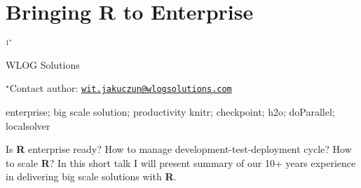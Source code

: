 \documentclass[\main/boa.tex]{subfiles}
\begin{document}
\section{Bringing R to Enterprise}

\begin{center}
  {\bf {}$^{1^\star}$}
\end{center}

\vskip 0.3cm

\begin{affiliations}
\begin{enumerate}
\begin{minipage}{0.915\textwidth}
\centering
\item WLOG Solutions \\[-2pt]
\end{minipage}
\end{enumerate}
$^\star$Contact author: \href{mailto:wit.jakuczun@wlogsolutions.com}{\nolinkurl{wit.jakuczun@wlogsolutions.com}}\\
\end{affiliations}

\vskip 0.5cm

\begin{minipage}{0.915\textwidth}
\keywords enterprise; big scale solution; productivity
\packages knitr; checkpoint; h2o; doParallel; localsolver
\end{minipage}

\vskip 0.8cm

Is \textbf{R} enterprise ready? How to manage
development-test-deployment cycle? How to scale \textbf{R}? In this
short talk I will present summary of our 10+ years experience in
delivering big scale solutions with \textbf{R}.
\end{document}
